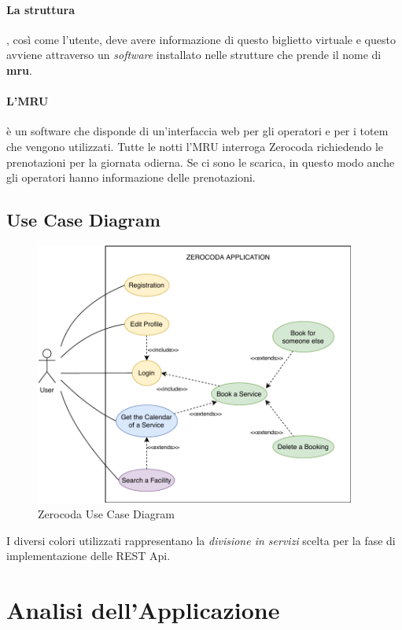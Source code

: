 \paragraph{La struttura}, così come l’utente, deve avere informazione di questo biglietto virtuale e questo avviene attraverso un \textsl{software} installato nelle strutture che prende il nome di \textbf{mru}.
\paragraph{L'MRU} è un software che disponde di un'interfaccia web per gli operatori e per i totem che vengono utilizzati. Tutte le notti l'MRU interroga Zerocoda richiedendo le prenotazioni per la giornata odierna. Se ci sono le scarica, in questo modo anche gli operatori hanno informazione delle prenotazioni.

\subsection{Use Case Diagram}
\begin{figure}[H]
    \centering
    \includegraphics[width=0.94\textwidth]{images/02_2_zerocoda_usecase.pdf}
    \caption{Zerocoda Use Case Diagram}
    \label{fig:zerocodausecase}
\end{figure}
I diversi colori utilizzati rappresentano la \textit{divisione in servizi} scelta per la fase di implementazione delle REST Api.

\section{Analisi dell'Applicazione}
